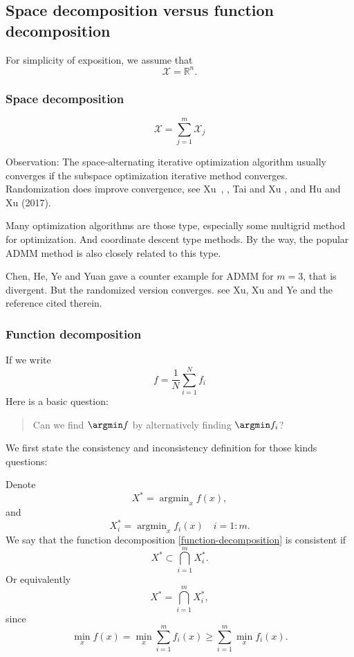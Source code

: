 \subsection{Space decomposition versus function decomposition}
For simplicity of exposition, we assume that 
$$
\mathcal X=\mathbb R^n.
$$

\subsubsection{Space decomposition}
$$
\mathcal X=\sum_{j=1}^m\mathcal X_j
$$

Observation: The space-alternating iterative optimization algorithm
usually converges if the subspace optimization iterative method
converges.  Randomization does improve convergence, see
Xu~\cite{xu1992iterative}, \cite{xu2002method},  Tai and Xu
\cite{tai2002global}, and Hu and Xu (2017).

Many optimization algorithms are those type, especially some multigrid
method for optimization. And coordinate descent type methods. By the
way, the popular ADMM method is also closely related to this type.

Chen, He, Ye and Yuan \cite{chen2016direct} gave a counter example for ADMM for
$m=3$, that is divergent.  But the randomized version converges.  see
Xu, Xu and Ye \cite{xu2017derandomized} and the reference cited
therein.

\subsubsection{Function decomposition}
If we write 
\begin{equation}
\label{function-decomposition}
f=\frac{1}{N}\sum_{i=1}^Nf_i  
\end{equation}
Here is a basic question:
\begin{quote}
	Can we find $\argmin f$ by alternatively finding $\argmin f_i$?
\end{quote}

We first state the consistency and inconsistency definition for those kinds questions:
\begin{definition}
	Denote 
	$$
	X^* = \mathop{\arg\min}_{x} f(x),
	$$
	and 
	$$
	X_i^* =  \mathop{\arg\min}_{x} f_i(x) \quad i = 1:m.
	$$
	We say that the function decomposition
	\eqref{function-decomposition} is consistent if 
	\begin{equation}
	\label{xxi0}
	X^* \subset \bigcap_{i=1}^m X_i^*. 
	\end{equation}
	Or equivalently
	\begin{equation}
	\label{xxi1}
	X^* = \bigcap_{i=1}^m X_i^*,          
	\end{equation}
	since
	$$
	\min_x f(x) = \min_x \sum_{i=1}^m f_i(x) \ge \sum_{i=1}^m \min_x f_i(x).
	$$
\end{definition}


